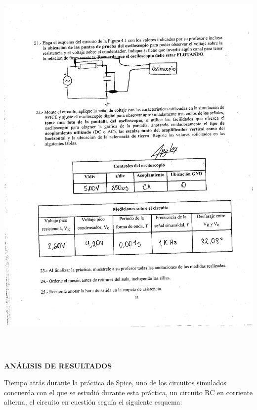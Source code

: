 \documentclass[12pt]{article}
\begin{document}
	\begin{center}
		\includegraphics[width=16cm,height=20cm]{Img/anex_lab_4_0007}
	\end{center}
	
	
	\newpage
	
	\newpage
	
	\begin{center}
		\textbf{\large ANÁLISIS DE RESULTADOS}\\
	\end{center}
	
	\noindent Tiempo atrás durante la práctica de Spice, uno de los circuitos simulados concuerda con el que se estudió durante esta práctica, un circuito RC en corriente alterna, el circuito en cuestión seguía el siguiente esquema:
	
\end{document}
